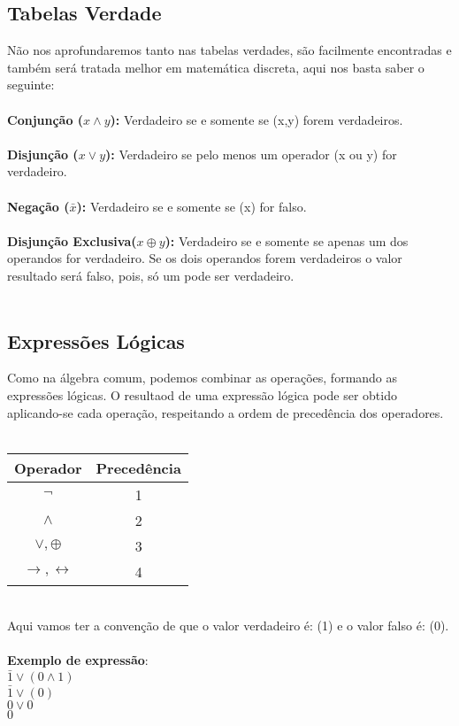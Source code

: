 \documentclass[12pt, onecolumn]{article}
\begin{document}
		\subsection{Tabelas Verdade}
	Não nos aprofundaremos tanto nas tabelas verdades, são facilmente encontradas
	e também será tratada melhor em matemática discreta, aqui nos basta saber o
	seguinte: \\
	\\
	\textbf{Conjunção ($x \land y$):} Verdadeiro se e somente se (x,y) forem
	verdadeiros.\\
	\\
	\textbf{Disjunção ($x \lor y$):} Verdadeiro se pelo menos um operador (x ou y) 
	for verdadeiro.\\
	\\
	\textbf{Negação ($\bar{x}$):} Verdadeiro se e somente se (x) for falso.\\
	\\
	\textbf{Disjunção Exclusiva($x \oplus y$):} Verdadeiro se e somente se
	apenas um dos operandos for verdadeiro. Se os dois operandos forem verdadeiros
	o valor resultado será falso, pois, só um pode ser verdadeiro.\\
	\\

		\subsection{Expressões Lógicas}
	Como na álgebra comum, podemos combinar as operações, formando as expressões
	lógicas. O resultaod de uma expressão lógica pode ser obtido aplicando-se 
	cada operação, respeitando a ordem de precedência dos operadores.\\
	\\
		\begin{table}[h]
			\centering
			\begin{tabular}{|c|c|}
				\hline
				Operador & Precedência\\ \hline

				$\lnot$ & 1 \\
				$\land$ & 2 \\
				$\lor, \oplus$ & 3 \\
				$\longrightarrow, \longleftrightarrow$ & 4 \\
				\hline
			\end{tabular}
		\end{table}
	\\
	Aqui vamos ter a convenção de que o valor verdadeiro é: (1) e o valor
	falso é: (0).\\
	\\
	\textbf{Exemplo de expressão}: 
	\\
	$\bar{1} \lor (0 \land 1)$\\
	$ \bar{1} \lor (0)$\\
	$0 \lor 0$\\
	$0$\\
	\\
\end{document}
